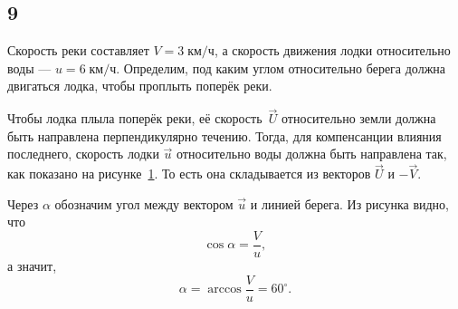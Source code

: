 \subsection{9}

Скорость реки составляет $V=3\;\text{км/ч}$, а скорость движения лодки относительно воды --- $u=6\;\text{км/ч}$. Определим, под каким углом относительно берега должна двигаться лодка, чтобы проплыть поперёк реки.

Чтобы лодка плыла поперёк реки, её скорость~$\vec U$ относительно земли должна быть направлена перпендикулярно течению. Тогда, для компенсанции влияния последнего, скорость лодки $\vec u$ относительно воды должна быть направлена так, как показано на рисунке~\ref{pic:9.1}. То есть она складывается из векторов $\vec U$ и $-\vec V$.
\begin{figure}[h!]
	\begin{center}
		\caption{}\label{pic:9.1}
	\end{center}
\end{figure}

Через $\alpha$ обозначим угол между вектором $\vec u$ и линией берега. Из рисунка видно, что
\[
\cos\alpha=\frac{V}{u},
\]
а значит,
\[
\alpha=\arccos\frac{V}{u}=60^\circ.
\]
